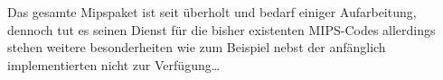 \begin{bemerkung}[MIPS]
    Das gesamte Mipspaket ist seit  überholt und bedarf einiger Aufarbeitung, dennoch tut es seinen Dienst für die bisher existenten MIPS-Codes allerdings stehen weitere besonderheiten wie zum Beispiel  nebst der anfänglich implementierten nicht zur Verfügung\ldots
\end{bemerkung}



